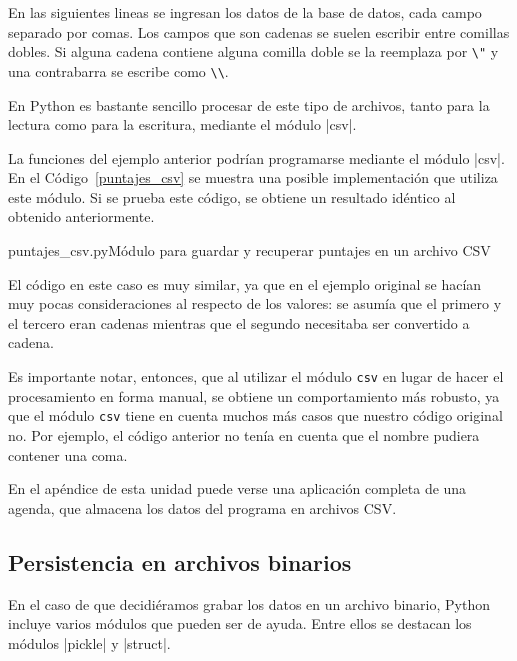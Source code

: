 En las siguientes lineas se ingresan los datos de la base de datos, cada
campo separado por comas. Los campos que son cadenas se suelen escribir
entre comillas dobles. Si alguna cadena contiene alguna comilla doble se la
reemplaza por \verb!\"! y una contrabarra se escribe como \verb!\\!.

En Python es bastante sencillo procesar de este tipo de archivos, tanto
para la lectura como para la escritura, mediante el módulo |csv|.

La funciones del ejemplo anterior podrían programarse mediante el módulo
|csv|.  En el Código~\ref{puntajes_csv} se muestra una posible implementación
que utiliza este módulo.  Si se prueba este código, se obtiene un resultado
idéntico al obtenido anteriormente.

\begin{codigo}{puntajes\_csv.py}{Módulo para guardar y recuperar puntajes en un archivo CSV}
\label{puntajes_csv}

\end{codigo}

El código en este caso es muy similar, ya que en el ejemplo original se
hacían muy pocas consideraciones al respecto de los valores: se asumía que
el primero y el tercero eran cadenas mientras que el segundo necesitaba ser
convertido a cadena.

\begin{observacion}
Es importante notar, entonces, que al utilizar el módulo \lstinline!csv!
en lugar de hacer el procesamiento en forma manual, se obtiene un
comportamiento más robusto, ya que el módulo \lstinline!csv! tiene en
cuenta muchos más casos que nuestro código original no. Por ejemplo, el
código anterior no tenía en cuenta que el nombre pudiera contener una coma.
\end{observacion}

En el apéndice de esta unidad puede verse una aplicación completa de una
agenda, que almacena los datos del programa en archivos CSV.

\subsection{Persistencia en archivos binarios}

En el caso de que decidiéramos grabar los datos en un archivo binario,
Python incluye varios módulos que pueden ser de ayuda. Entre ellos se
destacan los módulos |pickle| y |struct|.

